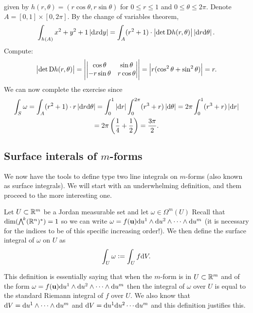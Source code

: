 \documentclass[11pt,a4paper]{article}
\begin{document}
\begin{solution}
  given by $h(r,\theta) = (r\cos\theta,r\sin\theta)$
  for $0 \le r \le 1$ and $0 \le \theta \le 2\pi$.
  Denote $A = [0,1] \times [0,2\pi]$.
  By the change of variables theorem,
  \[
    \int_{h(A)} x^2 + y^2 + 1 \abs{\dx \dy} =
    \int_{A} (r^2 + 1) \cdot \abs{\det \Dif h(r,\theta)} \abs{\dr \dtheta}.
  \]
  Compute:
  \[
    \left\lvert\det \mathrm{D} h(r,\theta)\right\rvert =
    \left\lvert
      \begin{vmatrix}
        \cos\theta & \sin\theta \\
        -r\sin\theta & r\cos\theta
      \end{vmatrix}
      \right\rvert =
    \left\lvert r(\cos^2\theta + \sin^2\theta)\right\rvert = r.
  \]
  We can now complete the exercise since
  \begin{multline*}
    \int_S \omega =
    \int_{A} (r^2 + 1) \cdot r \abs{\dr \dtheta} =
    \int_{0}^{1} \abs{\dr} \int_{0}^{2\pi} (r^3 + r) \abs{\dtheta} =
    2\pi \int_{0}^{1} (r^3 + r) \abs{\dr} \\ =
    2\pi \del{\frac{1}{4} + \frac{1}{2}} = \frac{3\pi}{2}.
  \end{multline*}
\end{solution}

\subsection{Surface interals of \texorpdfstring{$m$}{m}-forms}
\begin{remark}
  We now have the tools to define type two line integrals
  on $m$-forms (also known as surface integrals).
  We will start with an underwhelming definition,
  and them proceed to the more interesting one.
\end{remark}
\begin{definition}
  \label{def:surface-integral-m-m}
  Let $U \subset \mathbb{R}^m$ be a Jordan measurable set
  and let $\omega \in \Omega^m(U)$
  Recall that $\dim(\bigwedge^{\!k}(\mathbb{R}^n)^*) = 1$ so
  we can write
  $\omega = f(\boldsymbol{\mathbf{u}}) \mathrm{d} u^1 \wedge \mathrm{d} u^2 \wedge \cdots \wedge \mathrm{d} u^m$
  (it is
  necessary for the indices to be of this specific increasing order!).
  We then define the surface integral of $\omega$ on $U$ as
  \[
    \int_{U} \omega :=
    \int_{U} f \mathrm{d} V.
  \]
\end{definition}
\begin{remark}
  This definition is essentially saying that when the $m$-form
  is in $U \subset \mathbb{R}^m$ and of the form 
  $\omega = f(\boldsymbol{\mathbf{u}}) \mathrm{d} u^1 \wedge \mathrm{d} u^2 \wedge \cdots \wedge \mathrm{d} u^m$
  then the integral of $\omega$ over $U$ is equal to
  the standard Riemann integral of $f$ over $U$.
  We also know that $\mathrm{d} V = \mathrm{d} u^1 \wedge \cdots \wedge \mathrm{d} u^m$
  and $\mathrm{d} V = \mathrm{d} u^1 \mathrm{d} u^2 \cdots \mathrm{d} u^m$
  and this definition justifies this.
\end{remark}
\end{document}
